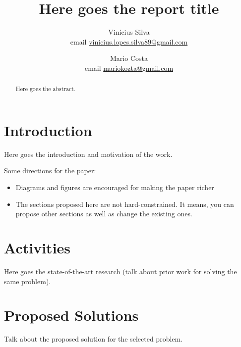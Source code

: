 \documentclass[10pt,twocolumn,letterpaper]{article}
\begin{document}
\title{Here goes the report title}
\author{Vin\'{i}cius Silva \\ email         \href{mailto:vinicius.lopes.silva89@gmail.com}{vinicius.lopes.silva89@gmail.com} 
\\ \and
Mario Costa \\ email \href{mariokozta@gmail.com}{mariokozta@gmail.com}
}

\maketitle
\begin{abstract}
Here goes the abstract. 
\end{abstract}

\section{Introduction}
Here goes the introduction and motivation of the work.

Some directions for the paper:

\begin{itemize}
	\item Diagrams and figures are encouraged for making the paper richer
	\item The sections proposed here are not hard-constrained. It means, you 
	can propose other sections as well as change the existing ones. 
\end{itemize}

\section{Activities}
Here goes the state-of-the-art research (talk about prior work for solving the same problem). 

\section{Proposed Solutions}
Talk about the proposed solution for the selected problem. 

\end{document}
